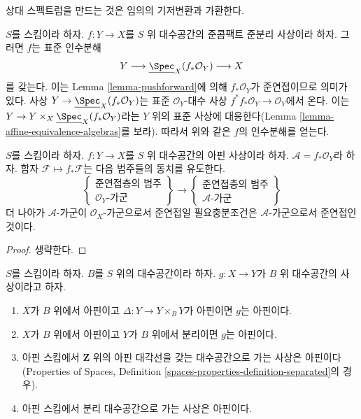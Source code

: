 \noindent
상대 스펙트럼을 만드는 것은 임의의 기저변환과 가환한다.

\begin{remark}
\label{remark-factorization-quasi-compact-quasi-separated}
$S$를 스킴이라 하자. $f : Y \to X$를 $S$ 위 대수공간의
준콤팩트 준분리 사상이라 하자. 그러면 $f$는 표준 인수분해
$$
Y \longrightarrow \underline{\Spec}_X(f_*\mathcal{O}_Y)
\longrightarrow X
$$
를 갖는다. 이는 Lemma \ref{lemma-pushforward}에 의해
$f_*\mathcal{O}_Y$가 준연접이므로 의미가 있다. 사상
$Y \to \underline{\Spec}_X(f_*\mathcal{O}_Y)$는 표준
$\mathcal{O}_Y$-대수 사상
 $f^*f_*\mathcal{O}_Y \to \mathcal{O}_Y$에서 온다. 이는
 $Y \to Y \times_X \underline{\Spec}_X(f_*\mathcal{O}_Y)$라는
 $Y$ 위의 표준 사상에 대응한다(Lemma
\ref{lemma-affine-equivalence-algebras}를 보라). 따라서 위와 같은
$f$의 인수분해를 얻는다.
\end{remark}

\begin{lemma}
\label{lemma-affine-equivalence-modules}
$S$를 스킴이라 하자.
$f : Y \to X$를 $S$ 위 대수공간의 아핀 사상이라 하자.
$\mathcal{A} = f_*\mathcal{O}_Y$라 하자.
함자 $\mathcal{F} \mapsto f_*\mathcal{F}$는 다음 범주들의 동치를
유도한다.
$$
\left\{
\begin{matrix}
\text{준연접층의 범주}\\
\mathcal{O}_Y\text{-가군}
\end{matrix}
\right\}
\longrightarrow
\left\{
\begin{matrix}
\text{준연접층의 범주}\\
\mathcal{A}\text{-가군}
\end{matrix}
\right\}
$$
더 나아가 $\mathcal{A}$-가군이 $\mathcal{O}_X$-가군으로서
준연접일 필요충분조건은 $\mathcal{A}$-가군으로서 준연접인 것이다.
\end{lemma}

\begin{proof}
생략한다.
\end{proof}

\begin{lemma}
\label{lemma-affine-permanence}
$S$를 스킴이라 하자. $B$를 $S$ 위의 대수공간이라 하자.
$g : X \to Y$가 $B$ 위 대수공간의 사상이라고 하자.
\begin{enumerate}
\item $X$가 $B$ 위에서 아핀이고 $\Delta : Y \to Y \times_B Y$가
아핀이면 $g$는 아핀이다.
\item $X$가 $B$ 위에서 아핀이고 $Y$가 $B$ 위에서 분리이면
$g$는 아핀이다.
\item 아핀 스킴에서 $\mathbf{Z}$ 위의 아핀 대각선을 갖는
대수공간으로 가는 사상은 아핀이다(Properties of Spaces,
Definition \ref{spaces-properties-definition-separated}의 경우).
\item 아핀 스킴에서 분리 대수공간으로 가는 사상은 아핀이다.
\end{enumerate}
\end{lemma}

